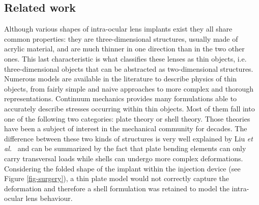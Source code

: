 \documentclass{llncs}
\begin{document}
\subsection{Related work}

Although various shapes of intra-ocular lens implants exist they all share common properties: they are three-dimensional structures, usually made of acrylic
material, and are much thinner in one direction than in the two other ones. This last characteristic is what classifies these lenses as thin objects, i.e. three-dimensional objects that can be abstracted as two-dimensional structures. Numerous models are available in the literature to describe physics of thin objects, from fairly simple and naive approaches to more complex and thorough representations. Continuum mechanics provides many formulations able to accurately describe stresses occurring within thin objects. Most of them fall into one of the following two categories: plate theory or shell theory. Those theories have been a subject of interest in the mechanical community for decades. The difference between these two kinds of structures is very well explained by Liu \textit{et al.}~\cite{Liu03} and can be summarized by the fact that plate bending elements can only carry transversal loads while shells can undergo more complex deformations. 
Considering the folded shape of the implant within the injection device (see Figure \ref{fig-surgery}), a thin plate model would not correctly capture the deformation and therefore a shell formulation was retained to model the intra-ocular lens behaviour. 

\end{document}
